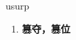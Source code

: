 
\begin{frame}
{\huge usurp}
\begin{center}
\begin{enumerate}\Large
  \item \textbf{篡夺，篡位}
\end{enumerate}
\end{center}
\end{frame}
